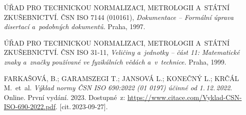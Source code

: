\begin{thebibliography}{99}
	ÚŘAD PRO TECHNICKOU NORMALIZACI, METROLOGII A~STÁTNÍ ZKUŠEBNICTVÍ.
	ČSN ISO 7144 (010161), \emph{Dokumentace -- Formální úprava disertací a~podobných dokumentů.}
	Praha, 1997.

	ÚŘAD PRO TECHNICKOU NORMALIZACI, METROLOGII A~STÁTNÍ ZKUŠEBNICTVÍ.
	ČSN ISO 31-11, \emph{Veličiny a~jednotky -- část 11: Matematické znaky a~značky používané ve fyzikálních vědách a~v~technice.}
	Praha, 1999.

	FARKAŠOVÁ, B.; GARAMSZEGI T.; JANSOVÁ L.; KONEČNÝ L.; KRČÁL M.\ et~al.
	\emph{Výklad normy ČSN ISO 690:2022 (01 0197) účinné od 1.\,12.\,2022}.
	 Online. První vydání. 2023.
	Dostupné~z:
	\url{https://www.citace.com/Vyklad-CSN-ISO-690-2022.pdf}.
	[cit.\,2023-09-27].

\end{thebibliography}


%
%
%
